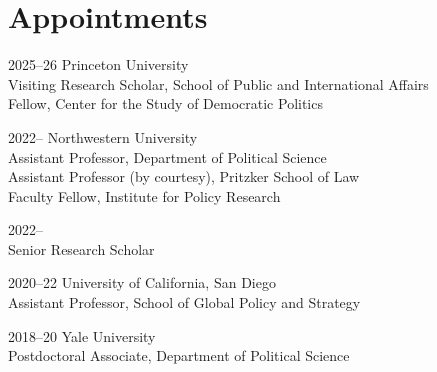 \documentclass[12pt,letterpaper]{report}
\begin{document}
    \section*{Appointments}

    \begin{tablist}
        \item[2025--26] \tab{}Princeton University \\
                       Visiting Research Scholar, School of Public and International Affairs \\
                       Fellow, Center for the Study of Democratic Politics \\


        \item[2022--]  \tab{}Northwestern University\\
                        Assistant Professor, Department of Political Science \\
                        Assistant Professor (by courtesy), Pritzker School of Law \\
                        Faculty Fellow, Institute for Policy Research \\
                        
                        
        \item[2022--]   \\
                        Senior Research Scholar \\
                        
        \item[2020--22]   \tab{}University of California, San Diego \\
                             Assistant Professor, School of Global Policy and Strategy \\

        \item[2018--20] \tab{}Yale University \\
                             Postdoctoral Associate, Department of Political Science \\ 

    \end{tablist}
\end{document}
